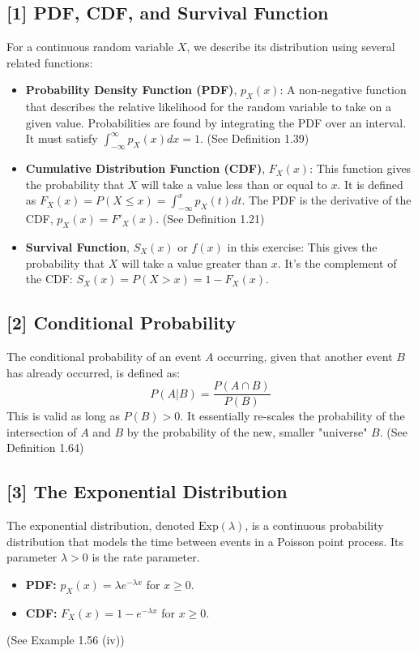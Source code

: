 \documentclass[11pt,a4paper]{article}
\begin{document}
\hypertarget{note:pdfcdf}{\subsection*{[1] PDF, CDF, and Survival Function}}
For a continuous random variable $X$, we describe its distribution using several related functions:
\begin{itemize}
    \item \textbf{Probability Density Function (PDF)}, $p_X(x)$: A non-negative function that describes the relative likelihood for the random variable to take on a given value. Probabilities are found by integrating the PDF over an interval. It must satisfy $\int_{-\infty}^{\infty} p_X(x)dx = 1$. (See Definition 1.39)
    \item \textbf{Cumulative Distribution Function (CDF)}, $F_X(x)$: This function gives the probability that $X$ will take a value less than or equal to $x$. It is defined as $F_X(x) = P(X \le x) = \int_{-\infty}^{x} p_X(t)dt$. The PDF is the derivative of the CDF, $p_X(x) = F'_X(x)$. (See Definition 1.21)
    \item \textbf{Survival Function}, $S_X(x)$ or $f(x)$ in this exercise: This gives the probability that $X$ will take a value greater than $x$. It's the complement of the CDF: $S_X(x) = P(X > x) = 1 - F_X(x)$.
\end{itemize}

\hypertarget{note:condprob}{\subsection*{[2] Conditional Probability}}
The conditional probability of an event $A$ occurring, given that another event $B$ has already occurred, is defined as:
\[ P(A|B) = \frac{P(A \cap B)}{P(B)} \]
This is valid as long as $P(B) > 0$. It essentially re-scales the probability of the intersection of $A$ and $B$ by the probability of the new, smaller "universe" $B$. (See Definition 1.64)

\hypertarget{note:exp}{\subsection*{[3] The Exponential Distribution}}
The exponential distribution, denoted $\text{Exp}(\lambda)$, is a continuous probability distribution that models the time between events in a Poisson point process. Its parameter $\lambda > 0$ is the rate parameter.
\begin{itemize}
    \item \textbf{PDF:} $p_X(x) = \lambda e^{-\lambda x}$ for $x \ge 0$.
    \item \textbf{CDF:} $F_X(x) = 1 - e^{-\lambda x}$ for $x \ge 0$.
\end{itemize}
(See Example 1.56 (iv))
\end{document}
